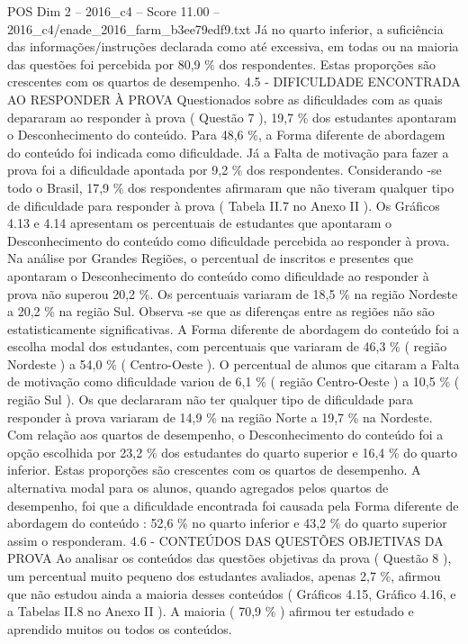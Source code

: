 \begin{textsample}{POS Dim 2 – 2016\_c4 – Score 11.00 – 2016\_c4/enade\_2016\_farm\_b3ee79edf9.txt}
Já no quarto inferior, a suficiência das informações/instruções declarada como até excessiva, em todas ou na maioria das questões foi percebida por 80,9 \% dos respondentes.
Estas proporções são crescentes com os quartos de desempenho. 4.5 - DIFICULDADE ENCONTRADA AO RESPONDER À PROVA Questionados sobre as dificuldades com as quais depararam ao responder à prova ( Questão 7 ), 19,7 \% dos estudantes apontaram o Desconhecimento do conteúdo.
Para 48,6 \%, a Forma diferente de abordagem do conteúdo foi indicada como dificuldade.
Já a Falta de motivação para fazer a prova foi a dificuldade apontada por 9,2 \% dos respondentes.
Considerando -se todo o Brasil, 17,9 \% dos respondentes afirmaram que não tiveram qualquer tipo de dificuldade para responder à prova ( Tabela II.7 no Anexo II ).
Os Gráficos 4.13 e 4.14 apresentam os percentuais de estudantes que apontaram o Desconhecimento do conteúdo como dificuldade percebida ao responder à prova.
Na análise por Grandes Regiões, o percentual de inscritos e presentes que apontaram o Desconhecimento do conteúdo como dificuldade ao responder à prova não superou 20,2 \%.
Os percentuais variaram de 18,5 \% na região Nordeste a 20,2 \% na região Sul.
Observa -se que as diferenças entre as regiões não são estatisticamente significativas.
A Forma diferente de abordagem do conteúdo foi a escolha modal dos estudantes, com percentuais que variaram de 46,3 \% ( região Nordeste ) a 54,0 \% ( Centro-Oeste ).
O percentual de alunos que citaram a Falta de motivação como dificuldade variou de 6,1 \% ( região Centro-Oeste ) a 10,5 \% ( região Sul ).
Os que declararam não ter qualquer tipo de dificuldade para responder à prova variaram de 14,9 \% na região Norte a 19,7 \% na Nordeste.
Com relação aos quartos de desempenho, o Desconhecimento do conteúdo foi a opção escolhida por 23,2 \% dos estudantes do quarto superior e 16,4 \% do quarto inferior.
Estas proporções são crescentes com os quartos de desempenho.
A alternativa modal para os alunos, quando agregados pelos quartos de desempenho, foi que a dificuldade encontrada foi causada pela Forma diferente de abordagem do conteúdo : 52,6 \% no quarto inferior e 43,2 \% do quarto superior assim o responderam. 4.6 - CONTEÚDOS DAS QUESTÕES OBJETIVAS DA PROVA Ao analisar os conteúdos das questões objetivas da prova ( Questão 8 ), um percentual muito pequeno dos estudantes avaliados, apenas 2,7 \%, afirmou que não estudou ainda a maioria desses conteúdos ( Gráficos 4.15, Gráfico 4.16, e a Tabelas II.8 no Anexo II ).
A maioria ( 70,9 \% ) afirmou ter estudado e aprendido muitos ou todos os conteúdos.

\end{textsample}
